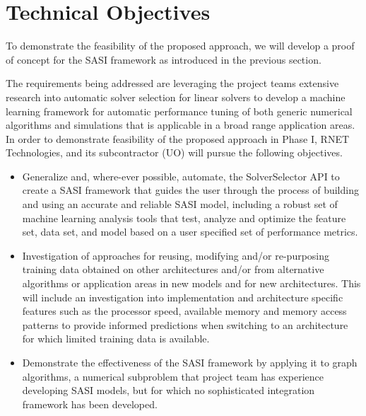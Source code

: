 \section{Technical Objectives}
 
To demonstrate the feasibility of the proposed approach,  we will develop a proof of concept for the SASI framework as introduced in the previous section. 

The requirements being addressed are leveraging the project teams extensive research into automatic solver selection
for linear solvers to develop a machine learning framework for automatic performance tuning of both generic numerical algorithms 
and simulations that is applicable in a broad range application areas. In order to demonstrate feasibility of the proposed approach in Phase I, RNET Technologies, and its subcontractor (UO) will pursue the following objectives.

\begin{itemize}
  \item Generalize and, where-ever possible, automate, the SolverSelector API to create a SASI framework that 
  guides the user through the process of building and using an accurate and reliable SASI model, including a robust set of machine learning analysis tools that test, analyze and optimize the feature set, data set, and model based on a user specified set of performance metrics. 
   
  \item Investigation of approaches for reusing, modifying and/or re-purposing training data obtained on other architectures and/or from alternative algorithms or application areas in new models and for new architectures. This will include an investigation into implementation and architecture specific features such as the processor speed, available memory and memory access patterns to provide informed predictions when switching to an architecture for which limited training data is available. 
  
  \item Demonstrate the effectiveness of the SASI framework by applying it to graph algorithms, a numerical subproblem that
  project team has experience developing SASI models, but for which no sophisticated integration framework has been developed. 
  
\end{itemize}

